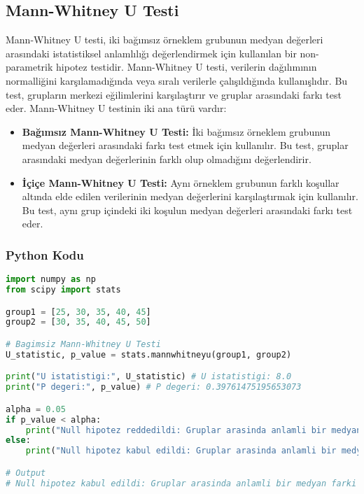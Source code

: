 \newpage

\subsection{Mann-Whitney U Testi}
Mann-Whitney U testi, iki bağımsız örneklem grubunun medyan değerleri arasındaki istatistiksel anlamlılığı değerlendirmek için kullanılan bir non-parametrik hipotez testidir. Mann-Whitney U testi, verilerin dağılımının normalliğini karşılamadığında veya sıralı verilerle çalışıldığında kullanışlıdır. Bu test, grupların merkezi eğilimlerini karşılaştırır ve gruplar arasındaki farkı test eder. Mann-Whitney U testinin iki ana türü vardır:

\begin{itemize}
    \item \textbf{Bağımsız Mann-Whitney U Testi:} İki bağımsız örneklem grubunun medyan değerleri arasındaki farkı test etmek için kullanılır. Bu test, gruplar arasındaki medyan değerlerinin farklı olup olmadığını değerlendirir.
    \item \textbf{İçiçe Mann-Whitney U Testi:} Aynı örneklem grubunun farklı koşullar altında elde edilen verilerinin medyan değerlerini karşılaştırmak için kullanılır. Bu test, aynı grup içindeki iki koşulun medyan değerleri arasındaki farkı test eder.
\end{itemize}

\subsubsection{Python Kodu}

\begin{lstlisting}[language=Python]
import numpy as np
from scipy import stats

group1 = [25, 30, 35, 40, 45]
group2 = [30, 35, 40, 45, 50]

# Bagimsiz Mann-Whitney U Testi
U_statistic, p_value = stats.mannwhitneyu(group1, group2)

print("U istatistigi:", U_statistic) # U istatistigi: 8.0
print("P degeri:", p_value) # P degeri: 0.39761475195653073

alpha = 0.05
if p_value < alpha:
    print("Null hipotez reddedildi: Gruplar arasinda anlamli bir medyan farki vardir.")
else:
    print("Null hipotez kabul edildi: Gruplar arasinda anlamli bir medyan farki yoktur.")

# Output
# Null hipotez kabul edildi: Gruplar arasinda anlamli bir medyan farki yoktur.
\end{lstlisting}

